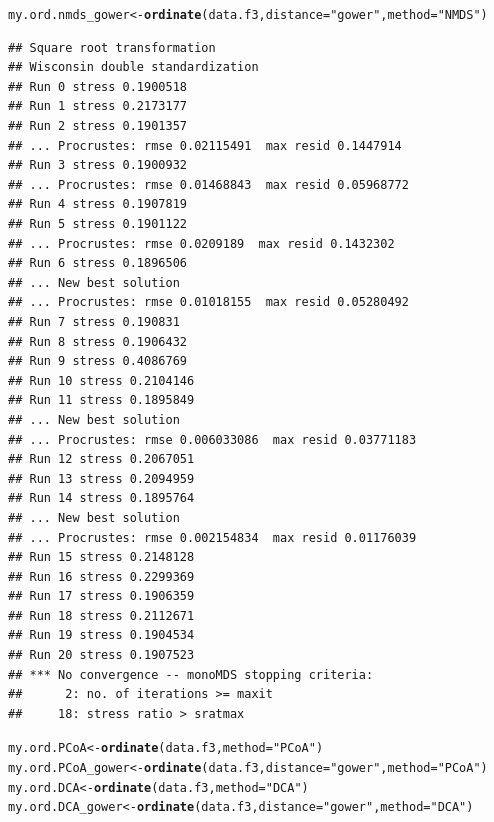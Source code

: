 \documentclass[12pt]{article}\usepackage[]{graphicx}\usepackage[]{color}
\makeatletter
\newcommand{\hlstr}[1]{\textcolor[rgb]{0.192,0.494,0.8}{#1}}%
\newcommand{\hlstd}[1]{\textcolor[rgb]{0.345,0.345,0.345}{#1}}%
\newcommand{\hlkwb}[1]{\textcolor[rgb]{0.69,0.353,0.396}{#1}}%
\newcommand{\hlkwc}[1]{\textcolor[rgb]{0.333,0.667,0.333}{#1}}%
\newcommand{\hlkwd}[1]{\textcolor[rgb]{0.737,0.353,0.396}{\textbf{#1}}}%
\newenvironment{kframe}{%
 \def\at@end@of@kframe{}%
 \ifinner\ifhmode%
  \def\at@end@of@kframe{\end{minipage}}%
  \begin{minipage}{\columnwidth}%
 \fi\fi%
 \def\FrameCommand##1{\hskip\@totalleftmargin \hskip-\fboxsep
 \colorbox{shadecolor}{##1}\hskip-\fboxsep
     \hskip-\linewidth \hskip-\@totalleftmargin \hskip\columnwidth}%
 \MakeFramed {\advance\hsize-\width
   \@totalleftmargin\z@ \linewidth\hsize
   \@setminipage}}%
 {\par\unskip\endMakeFramed%
 \at@end@of@kframe}
\newenvironment{knitrout}{}{} %
\numberwithin{figure}{section}
\makeatother
\begin{document}
\begin{knitrout}\small
{}\color{fgcolor}\begin{kframe}
\begin{alltt}
\hlstd{my.ord.nmds_gower} \hlkwb{<-} \hlkwd{ordinate}\hlstd{(data.f3,} \hlkwc{distance} \hlstd{=} \hlstr{"gower"}\hlstd{,}  \hlkwc{method} \hlstd{=} \hlstr{"NMDS"}\hlstd{)}
\end{alltt}
\begin{verbatim}
## Square root transformation
## Wisconsin double standardization
## Run 0 stress 0.1900518 
## Run 1 stress 0.2173177 
## Run 2 stress 0.1901357 
## ... Procrustes: rmse 0.02115491  max resid 0.1447914 
## Run 3 stress 0.1900932 
## ... Procrustes: rmse 0.01468843  max resid 0.05968772 
## Run 4 stress 0.1907819 
## Run 5 stress 0.1901122 
## ... Procrustes: rmse 0.0209189  max resid 0.1432302 
## Run 6 stress 0.1896506 
## ... New best solution
## ... Procrustes: rmse 0.01018155  max resid 0.05280492 
## Run 7 stress 0.190831 
## Run 8 stress 0.1906432 
## Run 9 stress 0.4086769 
## Run 10 stress 0.2104146 
## Run 11 stress 0.1895849 
## ... New best solution
## ... Procrustes: rmse 0.006033086  max resid 0.03771183 
## Run 12 stress 0.2067051 
## Run 13 stress 0.2094959 
## Run 14 stress 0.1895764 
## ... New best solution
## ... Procrustes: rmse 0.002154834  max resid 0.01176039 
## Run 15 stress 0.2148128 
## Run 16 stress 0.2299369 
## Run 17 stress 0.1906359 
## Run 18 stress 0.2112671 
## Run 19 stress 0.1904534 
## Run 20 stress 0.1907523 
## *** No convergence -- monoMDS stopping criteria:
##      2: no. of iterations >= maxit
##     18: stress ratio > sratmax
\end{verbatim}
\begin{alltt}
\hlstd{my.ord.PCoA} \hlkwb{<-} \hlkwd{ordinate}\hlstd{(data.f3,} \hlkwc{method} \hlstd{=} \hlstr{"PCoA"}\hlstd{)}
\hlstd{my.ord.PCoA_gower} \hlkwb{<-} \hlkwd{ordinate}\hlstd{(data.f3,} \hlkwc{distance} \hlstd{=} \hlstr{"gower"}\hlstd{,} \hlkwc{method} \hlstd{=} \hlstr{"PCoA"}\hlstd{)}
\hlstd{my.ord.DCA} \hlkwb{<-} \hlkwd{ordinate}\hlstd{(data.f3,} \hlkwc{method} \hlstd{=} \hlstr{"DCA"}\hlstd{)}
\hlstd{my.ord.DCA_gower} \hlkwb{<-} \hlkwd{ordinate}\hlstd{(data.f3,} \hlkwc{distance} \hlstd{=} \hlstr{"gower"}\hlstd{,} \hlkwc{method} \hlstd{=} \hlstr{"DCA"}\hlstd{)}


\end{alltt}
\end{kframe}
\end{knitrout}
\end{document}
